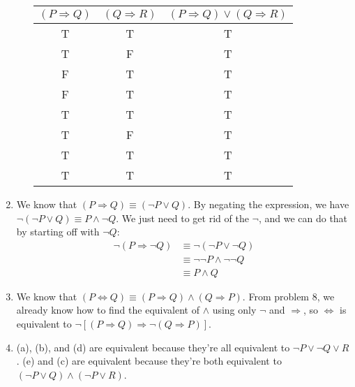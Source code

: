 \documentclass{article}
\begin{document}
\begin{enumerate}
\begin{enumerate}
      \begin{tabular}{c c c}
        $(P \Rightarrow Q)$ & $(Q \Rightarrow R)$ & $(P \Rightarrow Q) \lor (Q \Rightarrow R)$ \\ \hline
        T & T & T \\
        T & F & T \\
        F & T & T \\
        F & T & T \\
        T & T & T \\
        T & F & T \\
        T & T & T \\
        T & T & T \\
      \end{tabular}
  \end{enumerate}
\item
  We know that $(P \Rightarrow Q) \equiv (\lnot P \lor Q)$.  By negating the expression, we have $\lnot (\lnot P \lor Q) \equiv P \land \lnot Q$.  We just need to get rid of the $\lnot$, and we can do that by starting off with $\lnot Q$:
  \begin{equation*}
    \begin{aligned}
      \lnot (P \Rightarrow \lnot Q) &\equiv \lnot (\lnot P \lor \lnot Q) \\
      &\equiv \lnot \lnot P \land \lnot \lnot Q \\
      &\equiv P \land Q
    \end{aligned}
    \end{equation*}
\item
  We know that $(P \iff Q) \equiv (P \Rightarrow Q) \land (Q \Rightarrow P)$.  From problem 8, we already know how to find the equivalent of $\land$ using only $\lnot$ and $\Rightarrow$, so $\iff$ is equivalent to $\lnot [(P \Rightarrow Q) \Rightarrow \lnot (Q \Rightarrow P)]$.
\item
  (a), (b), and (d) are equivalent because they're all equivalent to $\lnot P \lor \lnot Q \lor R$.  (e) and (c) are equivalent because they're both equivalent to $(\lnot P \lor Q) \land (\lnot P \lor R)$.
\end{enumerate}
\end{document}
